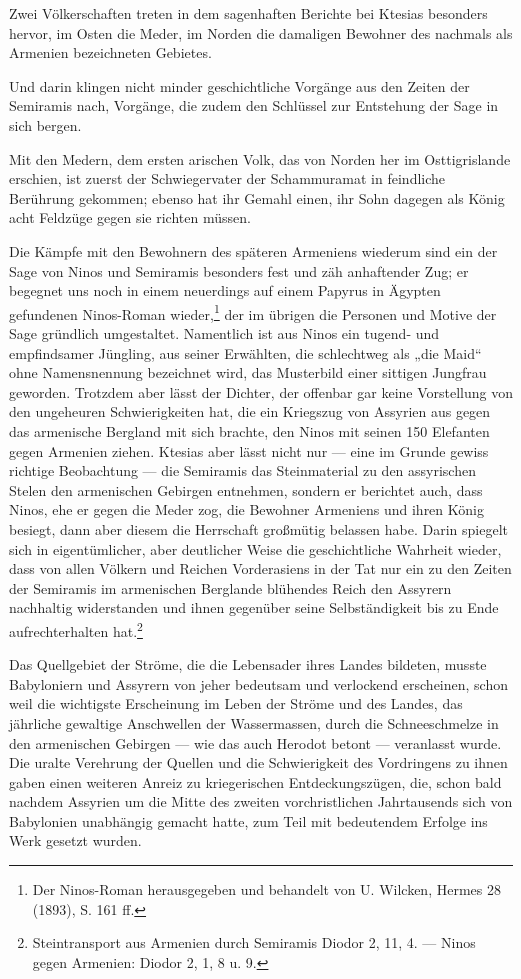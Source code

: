 \documentclass[a4paper, 11pt, oneside, polutonikogreek, german]{article}
\begin{document}
Zwei Völkerschaften treten in dem sagenhaften Berichte bei Ktesias besonders hervor, im Osten die Meder, im Norden die damaligen Bewohner des nachmals als Armenien bezeichneten Gebietes.

Und darin klingen nicht minder geschichtliche Vorgänge aus den Zeiten der Semiramis nach, Vorgänge, die zudem den Schlüssel zur Entstehung der Sage in sich bergen.

Mit den Medern, dem ersten arischen Volk, das von Norden her im Osttigrislande erschien, ist zuerst der Schwiegervater der Schammuramat in feindliche Berührung gekommen; ebenso hat ihr Gemahl einen, ihr Sohn dagegen als König acht Feldzüge gegen sie richten müssen.

Die Kämpfe mit den Bewohnern des späteren Armeniens wiederum sind ein der Sage von Ninos und Semiramis besonders fest und zäh anhaftender Zug; er begegnet uns noch in einem neuerdings auf einem Papyrus in Ägypten gefundenen Ninos-Roman wieder,\footnote{Der Ninos-Roman herausgegeben und behandelt von U. Wilcken, Hermes 28 (1893), S. 161 ff.} der im übrigen die Personen und Motive der Sage gründlich umgestaltet. Namentlich ist aus Ninos ein tugend- und empfindsamer Jüngling, aus seiner Erwählten, die schlechtweg als „die Maid“ ohne Namensnennung bezeichnet wird, das Musterbild einer sittigen Jungfrau geworden. Trotzdem aber lässt der Dichter, der offenbar gar keine Vorstellung von den ungeheuren Schwierigkeiten hat, die ein Kriegszug von Assyrien aus gegen das armenische Bergland mit sich brachte, den Ninos mit seinen 150 Elefanten gegen Armenien ziehen. Ktesias aber lässt nicht nur --- eine im Grunde gewiss richtige Beobachtung --- die Semiramis das Steinmaterial zu den assyrischen Stelen den armenischen Gebirgen entnehmen, sondern er berichtet auch, dass Ninos, ehe er gegen die Meder zog, die Bewohner Armeniens und ihren König besiegt, dann aber diesem die Herrschaft großmütig belassen habe. Darin spiegelt sich in eigentümlicher, aber deutlicher Weise die geschichtliche Wahrheit wieder, dass von allen Völkern und Reichen Vorderasiens in der Tat nur ein zu den Zeiten der Semiramis im armenischen Berglande blühendes Reich den Assyrern nachhaltig widerstanden und ihnen gegenüber seine Selbständigkeit bis zu Ende aufrechterhalten hat.\footnote{Steintransport aus Armenien durch Semiramis Diodor 2, 11, 4. --- Ninos gegen Armenien: Diodor 2, 1, 8 u. 9.}

Das Quellgebiet der Ströme, die die Lebensader ihres Landes bildeten, musste Babyloniern und Assyrern von jeher bedeutsam und verlockend erscheinen, schon weil die wichtigste Erscheinung im Leben der Ströme und des Landes, das jährliche gewaltige Anschwellen der Wassermassen, durch die Schneeschmelze in den armenischen Gebirgen --- wie das auch Herodot betont --- veranlasst wurde. Die uralte Verehrung der Quellen und die Schwierigkeit des Vordringens zu ihnen gaben einen weiteren Anreiz zu kriegerischen Entdeckungszügen, die, schon bald nachdem Assyrien um die Mitte des zweiten vorchristlichen Jahrtausends sich von Babylonien unabhängig gemacht hatte, zum Teil mit bedeutendem Erfolge ins Werk gesetzt wurden.
\end{document}
